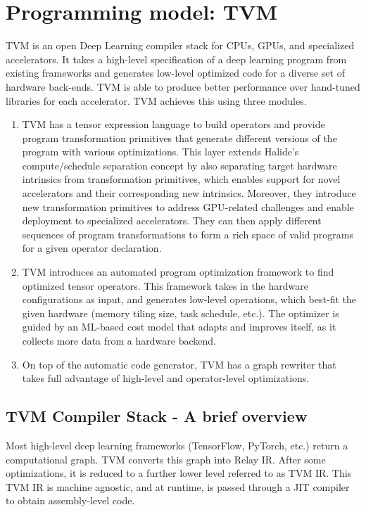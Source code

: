 \section{Programming model: TVM}
TVM is an open Deep Learning compiler stack for CPUs, GPUs, and specialized accelerators. It takes a high-level specification of a deep learning program from existing frameworks and generates low-level optimized code for a diverse set of hardware back-ends. TVM is able to produce better performance over hand-tuned libraries for each accelerator. TVM achieves this using three modules.

\begin{enumerate}
    \item TVM has a tensor expression language to build operators and provide program transformation primitives that generate different versions of the program with various optimizations. This layer extends Halide’s compute/schedule separation concept by also separating target hardware intrinsics from transformation primitives, which enables support for novel accelerators and their corresponding new intrinsics. Moreover, they introduce new transformation primitives to address GPU-related challenges and enable deployment to specialized accelerators. They can then apply different sequences of program transformations to form a rich space of valid programs for a given operator declaration. 
    \item TVM introduces an automated program optimization framework to find optimized tensor operators. This framework takes in the hardware configurations as input, and generates low-level operations, which best-fit the given hardware (memory tiling size, task schedule, etc.). The optimizer is guided by an ML-based cost model that adapts and improves itself, as it collects more data from a hardware backend. 
    \item On top of the automatic code generator, TVM has a graph rewriter that takes full advantage of high-level and operator-level optimizations.
\end{enumerate}

\subsection{TVM Compiler Stack - A brief overview}
Most high-level deep learning frameworks (TensorFlow, PyTorch, etc.) return a computational graph. TVM converts this graph into Relay IR. After some optimizations, it is reduced to a further lower level referred to as TVM IR. This TVM IR is machine agnostic, and at runtime, is passed through a JIT compiler to obtain assembly-level code.

